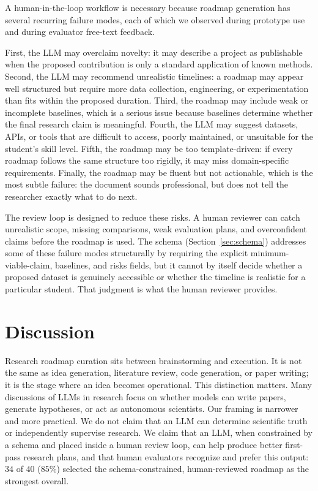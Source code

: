 \documentclass[11pt]{article}
\begin{document}
A human-in-the-loop workflow is necessary because roadmap generation has several recurring failure modes, each of which we observed during prototype use and during evaluator free-text feedback.

First, the LLM may overclaim novelty: it may describe a project as publishable when the proposed contribution is only a standard application of known methods. Second, the LLM may recommend unrealistic timelines: a roadmap may appear well structured but require more data collection, engineering, or experimentation than fits within the proposed duration. Third, the roadmap may include weak or incomplete baselines, which is a serious issue because baselines determine whether the final research claim is meaningful. Fourth, the LLM may suggest datasets, APIs, or tools that are difficult to access, poorly maintained, or unsuitable for the student's skill level. Fifth, the roadmap may be too template-driven: if every roadmap follows the same structure too rigidly, it may miss domain-specific requirements. Finally, the roadmap may be fluent but not actionable, which is the most subtle failure: the document sounds professional, but does not tell the researcher exactly what to do next.

The review loop is designed to reduce these risks. A human reviewer can catch unrealistic scope, missing comparisons, weak evaluation plans, and overconfident claims before the roadmap is used. The schema (Section~\ref{sec:schema}) addresses some of these failure modes structurally by requiring the explicit minimum-viable-claim, baselines, and risks fields, but it cannot by itself decide whether a proposed dataset is genuinely accessible or whether the timeline is realistic for a particular student. That judgment is what the human reviewer provides.

\section{Discussion}
\label{sec:discussion}

Research roadmap curation sits between brainstorming and execution. It is not the same as idea generation, literature review, code generation, or paper writing; it is the stage where an idea becomes operational. This distinction matters. Many discussions of LLMs in research focus on whether models can write papers, generate hypotheses, or act as autonomous scientists. Our framing is narrower and more practical. We do not claim that an LLM can determine scientific truth or independently supervise research. We claim that an LLM, when constrained by a schema and placed inside a human review loop, can help produce better first-pass research plans, and that human evaluators recognize and prefer this output: $34$ of $40$ ($85\%$) selected the schema-constrained, human-reviewed roadmap as the strongest overall.
\end{document}
